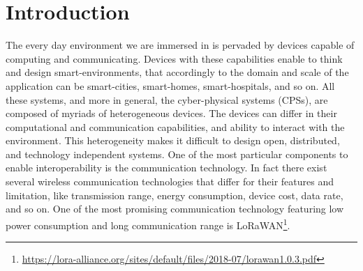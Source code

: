 \chapter{Introduction}
\label{chap:introduction}
The every day environment we are immersed in is pervaded by devices capable of computing and communicating.
Devices with these capabilities enable to think and design smart-environments, that accordingly to the domain and scale of the application can be smart-cities, smart-homes, smart-hospitals, and so on.
All these systems, and more in general, the cyber-physical systems (CPSs), are composed of myriads of heterogeneous devices.
The devices can differ in their computational and communication capabilities, and ability to interact with the environment.
This heterogeneity makes it difficult to design open, distributed, and technology independent systems. 
One of the most particular components to enable interoperability is the communication technology.
In fact there exist several wireless communication technologies that differ for their features and limitation, like transmission range, energy consumption, device cost, data rate, and so on.
One of the most promising communication technology featuring low power consumption and long communication range is \mbox{LoRaWAN}\footnote{\href{https://lora-alliance.org/sites/default/files/2018-07/lorawan1.0.3.pdf}{https://lora-alliance.org/sites/default/files/2018-07/lorawan1.0.3.pdf}}.

